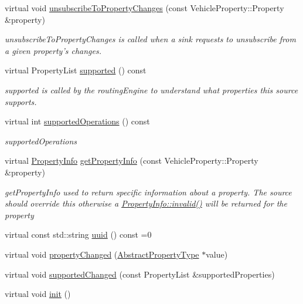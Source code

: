 \begin{DoxyCompactItemize}
virtual void \hyperlink{classAmbPluginImpl_a79ba9ce98ad124a1900960fa48161841}{unsubscribe\+To\+Property\+Changes} (const Vehicle\+Property\+::\+Property \&property)
\begin{DoxyCompactList}\small\item\em unsubscribe\+To\+Property\+Changes is called when a sink requests to unsubscribe from a given property's changes. \end{DoxyCompactList}\item 
virtual Property\+List \hyperlink{classAmbPluginImpl_a7e68d394462c7937b71a832e17a61bf4}{supported} () const 
\begin{DoxyCompactList}\small\item\em supported is called by the routing\+Engine to understand what properties this source supports. \end{DoxyCompactList}\item 
virtual int \hyperlink{classAmbPluginImpl_aa2ed14eb33f85a4bbf9d272e1f4b31bd}{supported\+Operations} () const 
\begin{DoxyCompactList}\small\item\em supported\+Operations \end{DoxyCompactList}\item 
virtual \hyperlink{classPropertyInfo}{Property\+Info} \hyperlink{classAmbPluginImpl_a1055d9c3af49bee75de80386888b8398}{get\+Property\+Info} (const Vehicle\+Property\+::\+Property \&property)
\begin{DoxyCompactList}\small\item\em get\+Property\+Info used to return specific information about a property. The source should override this otherwise a \hyperlink{classPropertyInfo_a5a3e9a1198ac54a40b1f3ae009bb1397}{Property\+Info\+::invalid()} will be returned for the property \end{DoxyCompactList}\item 
virtual const std\+::string \hyperlink{classAmbPluginImpl_abba832fa02a70798df7323b909c7a2c2}{uuid} () const =0
\item 
virtual void \hyperlink{classAmbPluginImpl_a3ca73b22f4ca3a98ec1abe6313fb0129}{property\+Changed} (\hyperlink{classAbstractPropertyType}{Abstract\+Property\+Type} $\ast$value)
\item 
virtual void \hyperlink{classAmbPluginImpl_a9ef528c7ee79bfd30132b926ce38b0ae}{supported\+Changed} (const Property\+List \&supported\+Properties)
\item 
virtual void \hyperlink{classAmbPluginImpl_a0e9fa59ffb80efe0e30fb5de78540a31}{init} ()
\end{DoxyCompactItemize}
